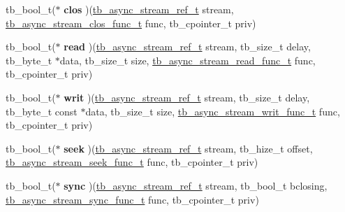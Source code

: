 \begin{DoxyCompactItemize}
{{{\item 
\hypertarget{structtb__async__stream__impl__t_a3c19ad4078c539e5e74ae0da852e1832}{tb\-\_\-bool\-\_\-t($\ast$ {\bfseries clos} )(\hyperlink{structtb__async__stream__ref__t}{tb\-\_\-async\-\_\-stream\-\_\-ref\-\_\-t} stream, \hyperlink{async__stream_8h_ac36a4cc85a417f2ac5394297fb801a20}{tb\-\_\-async\-\_\-stream\-\_\-clos\-\_\-func\-\_\-t} func, tb\-\_\-cpointer\-\_\-t priv)}\label{structtb__async__stream__impl__t_a3c19ad4078c539e5e74ae0da852e1832}

\item 
\hypertarget{structtb__async__stream__impl__t_a7bfac6f6fc6d264c62a00c3e57ccdb34}{tb\-\_\-bool\-\_\-t($\ast$ {\bfseries read} )(\hyperlink{structtb__async__stream__ref__t}{tb\-\_\-async\-\_\-stream\-\_\-ref\-\_\-t} stream, tb\-\_\-size\-\_\-t delay, tb\-\_\-byte\-\_\-t $\ast$data, tb\-\_\-size\-\_\-t size, \hyperlink{async__stream_8h_aca0105f67fde8666e6e0f9b907136634}{tb\-\_\-async\-\_\-stream\-\_\-read\-\_\-func\-\_\-t} func, tb\-\_\-cpointer\-\_\-t priv)}\label{structtb__async__stream__impl__t_a7bfac6f6fc6d264c62a00c3e57ccdb34}

\item 
\hypertarget{structtb__async__stream__impl__t_aae9da9a719942538c810fbbd343907bd}{tb\-\_\-bool\-\_\-t($\ast$ {\bfseries writ} )(\hyperlink{structtb__async__stream__ref__t}{tb\-\_\-async\-\_\-stream\-\_\-ref\-\_\-t} stream, tb\-\_\-size\-\_\-t delay, tb\-\_\-byte\-\_\-t const $\ast$data, tb\-\_\-size\-\_\-t size, \hyperlink{async__stream_8h_a388210c1b03dbf28cf3f47f26449beb5}{tb\-\_\-async\-\_\-stream\-\_\-writ\-\_\-func\-\_\-t} func, tb\-\_\-cpointer\-\_\-t priv)}\label{structtb__async__stream__impl__t_aae9da9a719942538c810fbbd343907bd}

\item 
\hypertarget{structtb__async__stream__impl__t_a3babd268f90a64c0eafef4c59ffba176}{tb\-\_\-bool\-\_\-t($\ast$ {\bfseries seek} )(\hyperlink{structtb__async__stream__ref__t}{tb\-\_\-async\-\_\-stream\-\_\-ref\-\_\-t} stream, tb\-\_\-hize\-\_\-t offset, \hyperlink{async__stream_8h_a3c6ab6b8e797a0bab6f9f150087ef39b}{tb\-\_\-async\-\_\-stream\-\_\-seek\-\_\-func\-\_\-t} func, tb\-\_\-cpointer\-\_\-t priv)}\label{structtb__async__stream__impl__t_a3babd268f90a64c0eafef4c59ffba176}

\item 
\hypertarget{structtb__async__stream__impl__t_a6d85c1ba221d0188a7dac348684994fd}{tb\-\_\-bool\-\_\-t($\ast$ {\bfseries sync} )(\hyperlink{structtb__async__stream__ref__t}{tb\-\_\-async\-\_\-stream\-\_\-ref\-\_\-t} stream, tb\-\_\-bool\-\_\-t bclosing, \hyperlink{async__stream_8h_aa458907d6087a31b50edc3633800ea6c}{tb\-\_\-async\-\_\-stream\-\_\-sync\-\_\-func\-\_\-t} func, tb\-\_\-cpointer\-\_\-t priv)}\label{structtb__async__stream__impl__t_a6d85c1ba221d0188a7dac348684994fd}

}}}
\end{DoxyCompactItemize}

